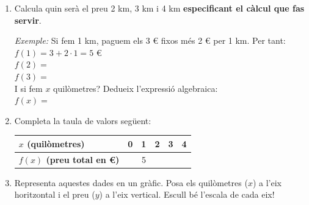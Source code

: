 \documentclass[12pt,a4paper]{article}
\begin{document}
\begin{enumerate}[label=\alph*)]
    \item Calcula quin serà el preu 2 km, 3 km i 4 km \textbf{especificant el càlcul que fas servir}. 
    
    \textit{Exemple:} Si fem 1 km, paguem els 3 € fixos més 2 € per 1 km. Per tant: \\
    \vspace{0.1cm}
    $f(1) = 3 + 2 \cdot 1 = 5 $ € \\
    \vspace{0.2cm}
    $f(2) = $ \\
    \vspace{0.2cm}
    $f(3) = $ \\
    \vspace{0.1cm}
    I si fem $x$ quilòmetres? Dedueix l'expressió algebraica: \\
    \vspace{0.2cm}
    $f(x) = $ 
    \item Completa la taula de valors següent:\\
    \renewcommand{\arraystretch}{1.8}
    \begin{tabular}{|l|c|c|c|c|c|}
        \hline
        \textbf{$x$ (quilòmetres)} & \hspace{0.5cm} 0 \hspace{0.5cm} & \hspace{0.5cm} 1 \hspace{0.5cm} & \hspace{0.5cm} 2 \hspace{0.5cm} & \hspace{0.5cm} 3 \hspace{0.5cm} & \hspace{0.5cm} 4 \hspace{0.5cm} \\ \hline
        \textbf{$f(x)$ (preu total en \euro)} & & 5 & & & \\ \hline
    \end{tabular}
    
    \item Representa aquestes dades en un gràfic. Posa els quilòmetres ($x$) a l'eix horitzontal i el preu ($y$) a l'eix vertical. Escull bé l'escala de cada eix!
    
    \vspace{0.3cm}
    \begin{center}
    \end{center}
    

\end{enumerate}
\end{document}
